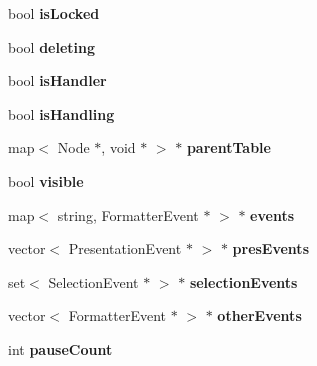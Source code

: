 \begin{CompactItemize}
\item 
bool {\bf isLocked}\label{classbr_1_1pucrio_1_1telemidia_1_1ginga_1_1ncl_1_1model_1_1components_1_1ExecutionObject_0774f698e7c923fe33adcfe95cdf9e73}

\item 
bool {\bf deleting}\label{classbr_1_1pucrio_1_1telemidia_1_1ginga_1_1ncl_1_1model_1_1components_1_1ExecutionObject_73dcd7977c4db81e50a24cbc794320c5}

\item 
bool {\bf isHandler}\label{classbr_1_1pucrio_1_1telemidia_1_1ginga_1_1ncl_1_1model_1_1components_1_1ExecutionObject_439756410b3e5309a20186b76a977f6c}

\item 
bool {\bf isHandling}\label{classbr_1_1pucrio_1_1telemidia_1_1ginga_1_1ncl_1_1model_1_1components_1_1ExecutionObject_5d4f0e8afd04a8d972939a60e5ccca9e}

\item 
map$<$ Node $\ast$, void $\ast$ $>$ $\ast$ {\bf parentTable}\label{classbr_1_1pucrio_1_1telemidia_1_1ginga_1_1ncl_1_1model_1_1components_1_1ExecutionObject_6094ae311aee85602f6075ec92b42b73}

\item 
bool {\bf visible}\label{classbr_1_1pucrio_1_1telemidia_1_1ginga_1_1ncl_1_1model_1_1components_1_1ExecutionObject_a54a57ae048476d840caf6d4d2c47aa3}

\item 
map$<$ string, FormatterEvent $\ast$ $>$ $\ast$ {\bf events}\label{classbr_1_1pucrio_1_1telemidia_1_1ginga_1_1ncl_1_1model_1_1components_1_1ExecutionObject_5726d399472c12fd85f1b31b90bf3f51}

\item 
vector$<$ PresentationEvent $\ast$ $>$ $\ast$ {\bf presEvents}\label{classbr_1_1pucrio_1_1telemidia_1_1ginga_1_1ncl_1_1model_1_1components_1_1ExecutionObject_c368bb28a9f9a3602bb8f8aac4aa66f3}

\item 
set$<$ SelectionEvent $\ast$ $>$ $\ast$ {\bf selectionEvents}\label{classbr_1_1pucrio_1_1telemidia_1_1ginga_1_1ncl_1_1model_1_1components_1_1ExecutionObject_b65a687634defb23bda0a580c30caa73}

\item 
vector$<$ FormatterEvent $\ast$ $>$ $\ast$ {\bf otherEvents}\label{classbr_1_1pucrio_1_1telemidia_1_1ginga_1_1ncl_1_1model_1_1components_1_1ExecutionObject_f2698dcead7f99c5889c7fae29f7ae3b}

\item 
int {\bf pauseCount}\label{classbr_1_1pucrio_1_1telemidia_1_1ginga_1_1ncl_1_1model_1_1components_1_1ExecutionObject_eb3e65c33924e8796c0e5c7aa223c00c}


\end{CompactItemize}
